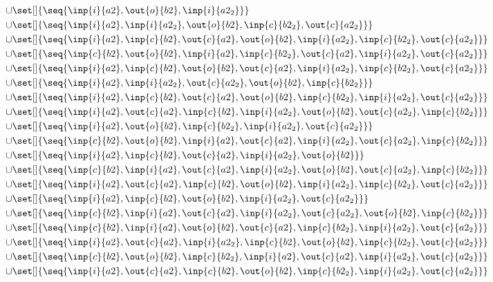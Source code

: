 \begin{align*}
\cup&\set[]{\seq{\inp{i}{a2},\out{o}{b2},\inp{i}{a2_2}}}\\
\cup&\set[]{\seq{\inp{i}{a2},\inp{i}{a2_2},\out{o}{b2},\inp{c}{b2_2},\out{c}{a2_2}}}\\
\cup&\set[]{\seq{\inp{i}{a2},\inp{c}{b2},\out{c}{a2},\out{o}{b2},\inp{i}{a2_2},\inp{c}{b2_2},\out{c}{a2_2}}}\\
\cup&\set[]{\seq{\inp{c}{b2},\out{o}{b2},\inp{i}{a2},\inp{c}{b2_2},\out{c}{a2},\inp{i}{a2_2},\out{c}{a2_2}}}\\
\cup&\set[]{\seq{\inp{i}{a2},\inp{c}{b2},\out{o}{b2},\out{c}{a2},\inp{i}{a2_2},\inp{c}{b2_2},\out{c}{a2_2}}}\\
\cup&\set[]{\seq{\inp{i}{a2},\inp{i}{a2_2},\out{c}{a2_2},\out{o}{b2},\inp{c}{b2_2}}}\\
\cup&\set[]{\seq{\inp{i}{a2},\inp{c}{b2},\out{c}{a2},\out{o}{b2},\inp{c}{b2_2},\inp{i}{a2_2},\out{c}{a2_2}}}\\
\cup&\set[]{\seq{\inp{i}{a2},\out{c}{a2},\inp{c}{b2},\inp{i}{a2_2},\out{o}{b2},\out{c}{a2_2},\inp{c}{b2_2}}}\\
\cup&\set[]{\seq{\inp{i}{a2},\out{o}{b2},\inp{c}{b2_2},\inp{i}{a2_2},\out{c}{a2_2}}}\\
\cup&\set[]{\seq{\inp{c}{b2},\out{o}{b2},\inp{i}{a2},\out{c}{a2},\inp{i}{a2_2},\out{c}{a2_2},\inp{c}{b2_2}}}\\
\cup&\set[]{\seq{\inp{i}{a2},\inp{c}{b2},\out{c}{a2},\inp{i}{a2_2},\out{o}{b2}}}\\
\cup&\set[]{\seq{\inp{c}{b2},\inp{i}{a2},\out{c}{a2},\inp{i}{a2_2},\out{o}{b2},\out{c}{a2_2},\inp{c}{b2_2}}}\\
\cup&\set[]{\seq{\inp{i}{a2},\out{c}{a2},\inp{c}{b2},\out{o}{b2},\inp{i}{a2_2},\inp{c}{b2_2},\out{c}{a2_2}}}\\
\cup&\set[]{\seq{\inp{i}{a2},\inp{c}{b2},\out{o}{b2},\inp{i}{a2_2},\out{c}{a2_2}}}\\
\cup&\set[]{\seq{\inp{c}{b2},\inp{i}{a2},\out{c}{a2},\inp{i}{a2_2},\out{c}{a2_2},\out{o}{b2},\inp{c}{b2_2}}}\\
\cup&\set[]{\seq{\inp{c}{b2},\inp{i}{a2},\out{o}{b2},\out{c}{a2},\inp{c}{b2_2},\inp{i}{a2_2},\out{c}{a2_2}}}\\
\cup&\set[]{\seq{\inp{i}{a2},\out{c}{a2},\inp{i}{a2_2},\inp{c}{b2},\out{o}{b2},\inp{c}{b2_2},\out{c}{a2_2}}}\\
\cup&\set[]{\seq{\inp{c}{b2},\out{o}{b2},\inp{c}{b2_2},\inp{i}{a2},\out{c}{a2},\inp{i}{a2_2},\out{c}{a2_2}}}\\
\cup&\set[]{\seq{\inp{i}{a2},\out{c}{a2},\inp{c}{b2},\out{o}{b2},\inp{c}{b2_2},\inp{i}{a2_2},\out{c}{a2_2}}}\\

\end{align*}
